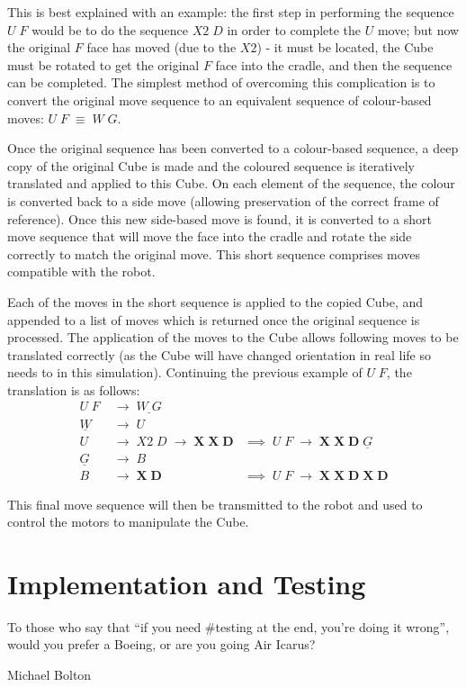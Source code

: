 \documentclass{report}
\begin{document}
    This is best explained with an example: the first step in performing the sequence $U\;F$ would be to do the sequence $X2\;D$ in order to complete the $U$ move; but now the original $F$ face has moved (due to the $X2$) - it must be located, the Cube must be rotated to get the original $F$ face into the cradle, and then the sequence can be completed. The simplest method of overcoming this complication is to convert the original move sequence to an equivalent sequence of colour-based moves: $U\;F\;\equiv\;W\;G$.
    
    Once the original sequence has been converted to a colour-based sequence, a deep copy of the original Cube is made and the coloured sequence is iteratively translated and applied to this Cube. On each element of the sequence, the colour is converted back to a side move (allowing preservation of the correct frame of reference). Once this new side-based move is found, it is converted to a short move sequence that will move the face into the cradle and rotate the side correctly to match the original move. This short sequence comprises moves compatible with the robot.
    
    Each of the moves in the short sequence is applied to the copied Cube, and appended to a list of moves which is returned once the original sequence is processed. The application of the moves to the Cube allows following moves to be translated correctly (as the Cube will have changed orientation in real life so needs to in this simulation). Continuing the previous example of $U\;F$, the translation is as follows:
    \begin{align*}
    U\;F\;&\rightarrow\;\underline{W\;G}\\
    \underline{W}\;&\rightarrow\;U\\
    U\;&\rightarrow\;X2\;D\;\rightarrow\;\boldsymbol{X\;X\;D}&\implies\;U\;F\;\rightarrow\;\boldsymbol{X\;X\;D}\;\underline{G}\\
    \underline{G}\;&\rightarrow\;B\\
    B\;&\rightarrow\;\boldsymbol{X\;D}&\implies\;U\;F\;\rightarrow\;\boldsymbol{X\;X\;D\;X\;D}
    \end{align*}
    
    This final move sequence will then be transmitted to the robot and used to control the motors to manipulate the Cube. %
    
    \newpage
    \chapter{Implementation and Testing}
    \epigraph{To those who say that \enquote{if you need \#testing at the end, you're doing it wrong}, would you prefer a Boeing, or are you going Air Icarus?}{Michael Bolton \cite{Bolton2016}}
\end{document}
